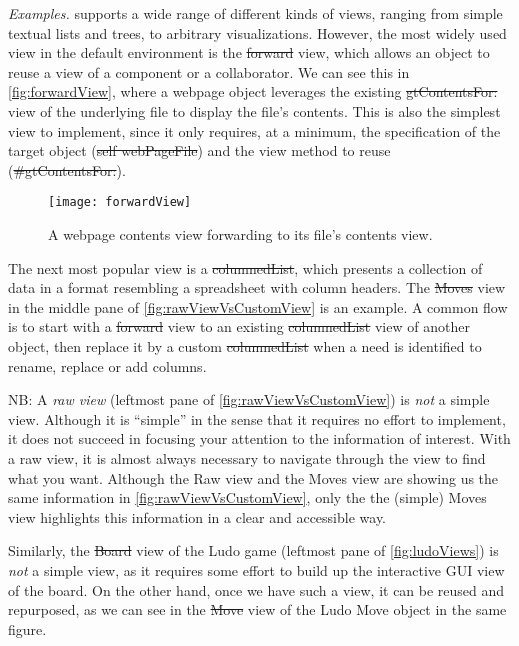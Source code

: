\documentclass[acmsmall,screen,authorversion,nonacm]{acmart} %
\newcommand\eog[1]{\nbc{Edward}{#1}{purple}}
\newcommand\cp[1]{\nbe{Cesare}{#1}{olive}} %
\newcommand{\GT}{\lst{GT}\xspace} %
\newcommand{\patsec}[1]{\noindent\textit{#1.}\xspace}
\begin{document}
\patsec{Examples}
\GT supports a wide range of different kinds of views, ranging from simple textual lists and trees, to arbitrary visualizations.
However, the most widely used view in the default environment is the \st{forward} view, which allows an object to reuse a view of a component or a collaborator.
We can see this in \autoref{fig:forwardView}, where a webpage object leverages the existing \st{gtContentsFor:} view of the underlying file to display the file's contents.
This is also the simplest view to implement, since it only requires, at a minimum, the specification of the target object (\st{self webPageFile}) and the view method to reuse (\st{#gtContentsFor:}).

\begin{figure}[h]
  \texttt{[image: forwardView]}
  \caption{A webpage contents view forwarding to its file's contents view.}
  \label{fig:forwardView}
\end{figure}

The next most popular view is a \st{columnedList}, which presents a collection of data in a format resembling a spreadsheet with column headers.
The \st{Moves} view in the middle pane of \autoref{fig:rawViewVsCustomView} is an example.
A common flow is to start with a \st{forward} view to an existing \st{columnedList} view of another object, then replace it by a custom \st{columnedList} when a need is identified to rename, replace or add columns.


NB: A \emph{raw view} (leftmost pane of \autoref{fig:rawViewVsCustomView}) is \emph{not} a simple view.
Although it is ``simple'' in the sense that it requires no effort to implement, it does not succeed in focusing your attention to the information of interest.
With a raw view, it is almost always necessary to navigate through the view to find what you want.
Although the Raw view and the Moves view are showing us the same information in \autoref{fig:rawViewVsCustomView}, only the the (simple) Moves view highlights this information in a clear and accessible way.

Similarly, the \st{Board} view of the Ludo game (leftmost pane of \autoref{fig:ludoViews}) is \emph{not} a simple view, as it requires some effort to build up the interactive GUI view of the board.
On the other hand, once we have such a view, it can be reused and repurposed, as we can see in the \st{Move} view of the Ludo Move object in the same figure.
\end{document}
